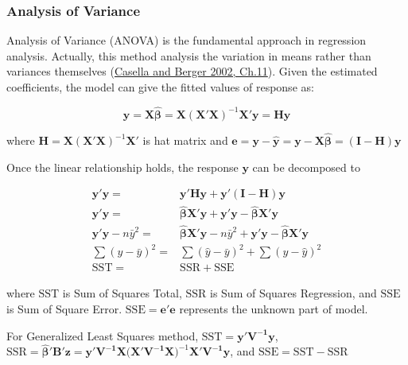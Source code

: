 \documentclass[
  11pt,
  openany]{memoir}
\begin{document}
\hypertarget{analysis-of-variance}{%
\subsubsection{Analysis of Variance}\label{analysis-of-variance}}

Analysis of Variance (ANOVA) is the fundamental approach in regression analysis. Actually, this method analysis the variation in means rather than variances themselves (\protect\hyperlink{ref-casellaStatisticalInference2002}{Casella and Berger 2002, Ch.11}).
Given the estimated coefficients, the model can give the fitted values of response as:

\begin{equation}
\mathbf{\hat y}=\mathbf{X}\boldsymbol{\hat\beta}=\mathbf{X}(\mathbf{X'X})^{-1}\mathbf{X'y}= \mathbf{Hy}
\label{eq:fitted-y}
\end{equation}

where \(\mathbf{H}=\mathbf{X}(\mathbf{X'X})^{-1}\mathbf{X'}\) is hat matrix and \(\mathbf{e}=\mathbf{y}-\mathbf{\hat y}=\mathbf{y}-\mathbf{X}\boldsymbol{\hat\beta}=(\mathbf{I}-\mathbf{H})\mathbf{y}\)

Once the linear relationship holds, the response \(\mathbf{y}\) can be decomposed to

\begin{equation}
\begin{split}
\mathbf{y'y}=&\mathbf{y'Hy}+\mathbf{y'}(\mathbf{I}-\mathbf{H})\mathbf{y}\\
\mathbf{y'y}=&\boldsymbol{\hat\beta}\mathbf{X'}\mathbf{y}+\mathbf{y'y}-\boldsymbol{\hat\beta}\mathbf{X'}\mathbf{y}\\
\mathbf{y'y}-n\bar y^2=&\boldsymbol{\hat\beta}\mathbf{X'}\mathbf{y}-n\bar y^2+\mathbf{y'y}-\boldsymbol{\hat\beta}\mathbf{X'}\mathbf{y}\\
\sum(y-\bar y)^2=&\sum(\hat y-\bar y)^2+\sum(y-\hat y)^2\\
\mathrm{SST} =& \mathrm{SSR} + \mathrm{SSE}
\end{split}
\label{eq:ss}
\end{equation}

where \(\mathrm{SST}\) is Sum of Squares Total, \(\mathrm{SSR}\) is Sum of Squares Regression, and \(\mathrm{SSE}\) is Sum of Square Error. \(\mathrm{SSE}=\mathbf{e'e}\) represents the unknown part of model.

For Generalized Least Squares method, \(\mathrm{SST}=\mathbf{y'V^{-1}y}\), \(\mathrm{SSR}= \boldsymbol{\hat\beta'}\mathbf{B'z}=\mathbf{y'V^{-1}X(X'V^{-1}X})^{-1}\mathbf{X'V^{-1}}\mathbf{y}\), and \(\mathrm{SSE}=\mathrm{SST}-\mathrm{SSR}\)
\end{document}
